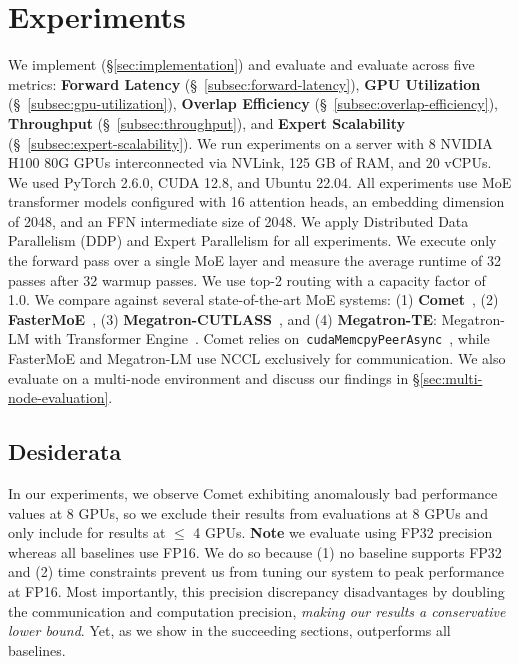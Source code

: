\section{Experiments}
\label{sec:evaluation}
We implement (\S\ref{sec:implementation}) and evaluate \sysname and evaluate across
five metrics: \textbf{Forward Latency} (\S~\ref{subsec:forward-latency}),
\textbf{GPU Utilization} (\S~\ref{subsec:gpu-utilization}),
\textbf{Overlap Efficiency} (\S~\ref{subsec:overlap-efficiency}),
\textbf{Throughput} (\S~\ref{subsec:throughput}), and \textbf{Expert Scalability} (\S~\ref{subsec:expert-scalability}).
We run experiments on a server with 8 NVIDIA H100 80G GPUs interconnected via NVLink,
125 GB of RAM, and 20 vCPUs. We used PyTorch 2.6.0, CUDA 12.8, and Ubuntu 22.04.
All experiments use MoE transformer models configured with 16 attention heads,
an embedding dimension of 2048, and an FFN intermediate size of 2048.
We apply Distributed Data Parallelism (DDP) and Expert Parallelism for all experiments.
We execute only the forward pass over a single MoE layer and measure the average runtime
of 32 passes after 32 warmup passes.
We use top-2 routing with a capacity factor of 1.0.
We compare \sysname against several state-of-the-art MoE systems:
(1) \textbf{Comet}~\cite{comet}, 
(2) \textbf{FasterMoE}~\cite{fastermoe}, 
(3) \textbf{Megatron-CUTLASS}~\cite{megatron-lm}, and
(4) \textbf{Megatron-TE}: Megatron-LM with Transformer Engine~\cite{transformer-engine}.
Comet relies on~\verb|cudaMemcpyPeerAsync|~\cite{fluxp2p}, while FasterMoE and Megatron-LM use NCCL exclusively for communication.
We also evaluate \sysname on a multi-node environment and discuss our findings in \S\ref{sec:multi-node-evaluation}.
\subsection{Desiderata}\label{subsec:desiderata}
In our experiments, we observe Comet exhibiting anomalously bad performance values at 8 GPUs,
so we exclude their results from evaluations at 8 GPUs and only include for results at $\leq$
4 GPUs.
\textbf{Note} we evaluate \sysname using FP32 precision whereas all baselines use FP16.
We do so because (1) no baseline supports FP32 and (2) time constraints prevent us from tuning our system
to peak performance at FP16.
Most importantly, this precision discrepancy disadvantages \sysname by doubling the
communication and computation precision, \emph{making our results a conservative lower bound}.
Yet, as we show in the succeeding sections, \sysname outperforms all baselines.
